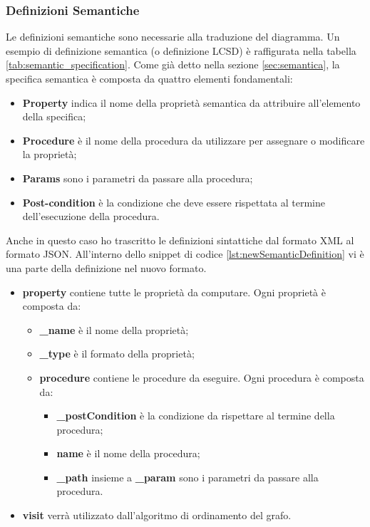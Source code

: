             \subsubsection{Definizioni Semantiche}
                Le definizioni semantiche sono necessarie alla traduzione del diagramma. Un esempio di definizione semantica (o definizione LCSD) è raffigurata nella tabella \ref{tab:semantic_specification}. Come già detto nella sezione \ref{sec:semantica}, la specifica semantica è composta da quattro elementi fondamentali: 
                \begin{itemize}
                    \item \textbf{Property} indica il nome della proprietà semantica da attribuire all'elemento della specifica;
                    \item \textbf{Procedure} è il nome della procedura da utilizzare per assegnare o modificare la proprietà;
                    \item \textbf{Params} sono i parametri da passare alla procedura;
                    \item \textbf{Post-condition} è la condizione che deve essere rispettata al termine dell'esecuzione della procedura.
                \end{itemize}
                Anche in questo caso ho trascritto le definizioni sintattiche dal formato XML al formato JSON. All'interno dello snippet di codice \ref{lst:newSemanticDefinition} vi è una parte della definizione nel nuovo formato. 
                \begin{itemize}
                    \item \textbf{property} contiene tutte le proprietà da computare. Ogni proprietà è composta da:
                    \begin{itemize}
                        \item \textbf{\_name} è il nome della proprietà;
                        \item \textbf{\_type} è il formato della proprietà;
                        \item \textbf{procedure} contiene le procedure da eseguire. Ogni procedura è composta da:
                        \begin{itemize}
                            \item \textbf{\_postCondition} è la condizione da rispettare al termine della procedura;
                            \item \textbf{name} è il nome della procedura;
                            \item \textbf{\_path} insieme a \textbf{\_param} sono i parametri da passare alla procedura.
                        \end{itemize}
                    \end{itemize}
                    \item \textbf{visit} verrà utilizzato dall'algoritmo di ordinamento del grafo.
                \end{itemize}
